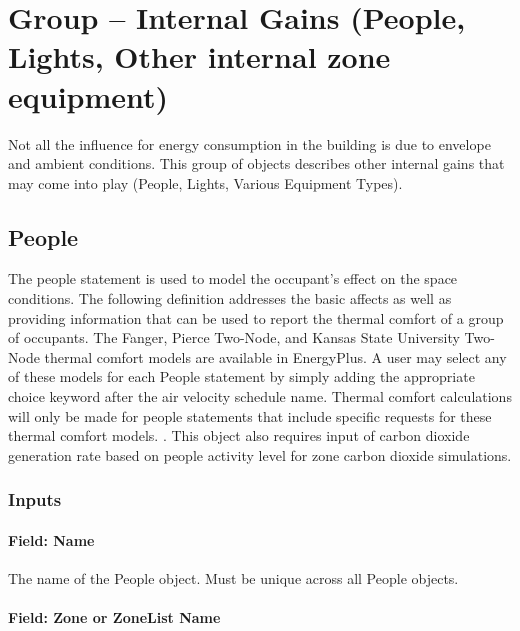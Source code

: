 \section[Group -- Internal Gains]{Group -- Internal Gains (People, Lights, Other internal zone equipment)}\label{group-internal-gains-people-lights-other-internal-zone-equipment}

Not all the influence for energy consumption in the building is due to envelope and ambient conditions. This group of objects describes other internal gains that may come into play (People, Lights, Various Equipment Types).

\subsection{People}\label{people}

The people statement is used to model the occupant's effect on the space conditions. The following definition addresses the basic affects as well as providing information that can be used to report the thermal comfort of a group of occupants. The Fanger, Pierce Two-Node, and Kansas State University Two-Node thermal comfort models are available in EnergyPlus. A user may select any of these models for each People statement by simply adding the appropriate choice keyword after the air velocity schedule name. Thermal comfort calculations will only be made for people statements that include specific requests for these thermal comfort models. . This object also requires input of carbon dioxide generation rate based on people activity level for zone carbon dioxide simulations.

\subsubsection{Inputs}\label{inputs-025}

\paragraph{Field: Name}\label{field-name-024}

The name of the People object. Must be unique across all People objects.

\paragraph{Field: Zone or ZoneList Name}\label{field-zone-or-zonelist-name-000}

